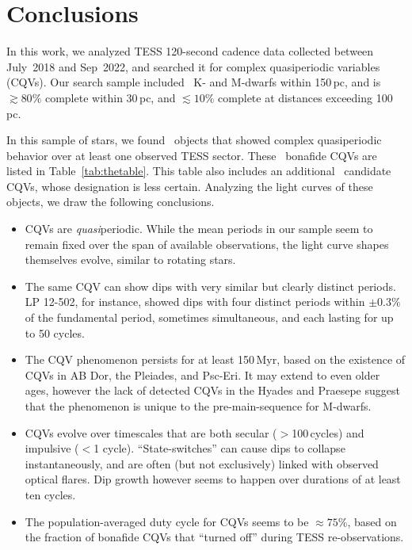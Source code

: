 \documentclass[11pt,twocolumn,tighten]{aastex63}
\begin{document}


\section{Conclusions}
\label{sec:conclusion}

In this work, we analyzed TESS
120-second cadence data 
collected between July~2018
and Sep~2022, and searched it for complex quasiperiodic variables (CQVs).
Our search sample included
\nstarssearched\ K- and M-dwarfs within 150\,pc,
and is $\gtrsim 80\%$ complete within 30\,pc, and $\lesssim 10\%$ complete
at distances exceeding 100\,pc.

In this sample of stars, we found \ngoods\ objects that showed complex
quasiperiodic behavior over at least one observed TESS sector.  
These \ngoods\ bonafide CQVs are listed in Table~\ref{tab:thetable}.
This table also includes an additional \nmaybes\ candidate CQVs, whose
designation is less certain.
Analyzing the light curves of these objects, we draw the following conclusions.

\begin{itemize}
  \item CQVs are {\it quasi}periodic.  While the mean periods in our
    sample seem to remain fixed over the span of available
    observations, the light curve shapes themselves evolve, similar to
    rotating stars.
  \item The same CQV can show dips with very similar but clearly
    distinct periods.  LP 12-502, for instance, showed dips with four
    distinct periods within $\pm 0.3\%$ of the fundamental period,
    sometimes simultaneous, and each lasting for up to 50 cycles.
  \item The CQV phenomenon persists for at least 150\,Myr, based on
    the existence of CQVs in AB Dor, the Pleiades, and Psc-Eri.  It
    may extend to even older ages, however the lack of detected CQVs
    in the Hyades and Praesepe suggest that the phenomenon is unique
    to the pre-main-sequence for M-dwarfs.
  \item CQVs evolve over timescales that are both secular
    ($>$100\,cycles) and impulsive ($<$1 cycle).  ``State-switches''
    can cause dips to collapse instantaneously, and are often (but not
    exclusively) linked with observed optical flares.  Dip growth
    however seems to happen over durations of at least ten cycles.
  \item The population-averaged duty cycle for CQVs seems to be
    $\approx 75$\%, based on the fraction of bonafide CQVs that
    ``turned off'' during TESS re-observations.
\end{itemize}
\end{document}
